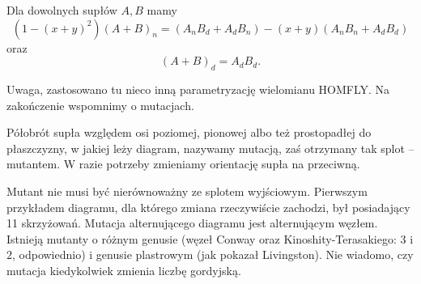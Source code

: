 \begin{proposition}
	Dla dowolnych supłów $A, B$ mamy
	\[
	(1 - (x+y)^2)(A+B)_n = (A_nB_d + A_dB_n) - (x+y)(A_nB_n+  A_dB_d)
	\]
	oraz
	\[
		(A+B)_d = A_dB_d.
	\]
\end{proposition}

Uwaga, zastosowano tu nieco inną parametryzację wielomianu HOMFLY.
Na zakończenie wspomnimy o mutacjach.

\begin{definition}[mutacja]
\label{def:mutant}
	Półobrót supła względem osi poziomej, pionowej albo też prostopadłej do płaszczyzny, w jakiej leży diagram, nazywamy mutacją, zaś otrzymany tak splot -- mutantem.
	W razie potrzeby zmieniamy orientację supła na przeciwną.
\end{definition}

Mutant nie musi być nierównoważny ze splotem wyjściowym.
Pierwszym przykładem diagramu, dla którego zmiana rzeczywiście zachodzi, był posiadający 11 skrzyżowań.
Mutacja alternującego diagramu jest alternującym węzłem.
Istnieją mutanty o różnym genusie (węzeł Conway oraz Kinoshity-Terasakiego: $3$ i $2$, odpowiednio) i genusie plastrowym (jak pokazał Livingston).
Nie wiadomo, czy mutacja kiedykolwiek zmienia liczbę gordyjską.



